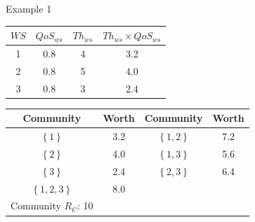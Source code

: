 \documentclass{beamer}
\begin{document}
\begin{frame}{Example 1}
    \begin{table}[!t]
    \renewcommand{\arraystretch}{1.3}
    \label{example_1}
    \centering
    \begin{tabular}{c c c c}
    \hline
    $WS$ & $QoS_{ws}$ & $Th_{ws}$ & $Th_{ws} \times QoS_{ws}$\\
    \hline
    1 & 0.8 & 4 & 3.2\\
    2 & 0.8 & 5 & 4.0\\
    3 & 0.8 & 3 & 2.4\\
    \hline
    \end{tabular}
    \end{table}

    \begin{table}[!t]
    \renewcommand{\arraystretch}{1.3}
    \label{example_1_2}
    \centering
    \begin{tabular}{c c || c c}
    \hline
    Community & Worth & Community & Worth\\
    \hline
    $\left\{1\right\}$ & 3.2 & $\left\{1,2\right\}$ & 7.2\\
    $\left\{2\right\}$ & 4.0 & $\left\{1,3\right\}$ & 5.6\\
    $\left\{3\right\}$ & 2.4 & $\left\{2,3\right\}$ & 6.4\\
    $\left\{1,2,3\right\}$ & 8.0\\
    \hline
    Community $R_C$: 10\\
    \hline
    \end{tabular}
    \end{table}
\end{frame}
\end{document}
